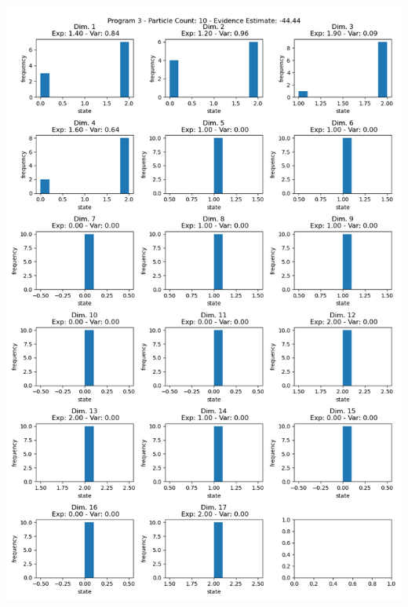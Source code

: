 \documentclass[10pt]{homeworg}
\begin{document}
\begin{center}
\includegraphics[scale=0.5]{figures/program3/10_particles.png}
\end{center}

\newpage
\end{document}
